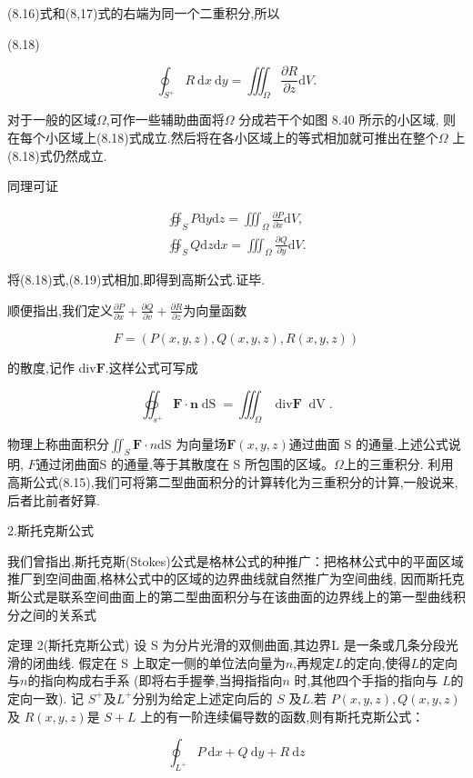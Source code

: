 \documentclass{article}
\begin{document}
(8.16)式和(8,17)式的右端为同一个二重积分,所以

(8.18)

$$\oint_{S^+}R\:\mathrm{d}x\:\mathrm{d}y=\iiint_{\Omega}\frac{\partial R}{\partial z}\mathrm{d}V.$$

对于一般的区域$\Omega$,可作一些辅助曲面将$\Omega$ 分成若干个如图 8.40 所示的小区域,
则在每个小区域上(8.18)式成立.然后将在各小区域上的等式相加就可推出在整个$\Omega$ 上(8.18)式仍然成立.

同理可证

$$\begin{aligned}\oiint_SP\mathrm{d}y\mathrm{d}z=\iiint_\Omega\frac{\partial P}{\partial x}\mathrm{d}V,\\\oiint_SQ\mathrm{d}z\mathrm{d}x=\iiint_\Omega\frac{\partial Q}{\partial y}\mathrm{d}V.\end{aligned}$$

将(8.18)式,(8.19)式相加,即得到高斯公式.证毕.

顺便指出,我们定义$\frac{\partial P}{\partial x}+\frac{\partial Q}{\partial v}+\frac{\partial R}{\partial z}$为向量函数

$$F=(P(x,y,z),Q(x,y,z),R(x,y,z))$$

的散度,记作 div$\boldsymbol{F}.$这样公式可写成

$$\oiint_{s^+}\boldsymbol{F}\cdot\boldsymbol{n}\operatorname{dS}=\iiint_{\Omega}\operatorname{div\boldsymbol{F}}\operatorname{dV}.$$

物理上称曲面积分$\iint_S\boldsymbol{F}\cdot n$dS 为向量场$\boldsymbol{F}(x,y,z)$通过曲面 S 的通量.上述公式说明,
$F$通过闭曲面S 的通量,等于其散度在 S 所包围的区域。$\Omega$上的三重积分.
利用高斯公式(8.15),我们可将第二型曲面积分的计算转化为三重积分的计算,一般说来,后者比前者好算.


\newpage
2.斯托克斯公式

我们曾指出,斯托克斯(Stokes)公式是格林公式的种推广：把格林公式中的平面区域推厂到空间曲面,格林公式中的区域的边界曲线就自然推广为空间曲线,
因而斯托克斯公式是联系空间曲面上的第二型曲面积分与在该曲面的边界线上的第一型曲线积分之间的关系式

定理 2(斯托克斯公式) 设 S 为分片光滑的双侧曲面,其边界L 是一条或几条分段光滑的闭曲线.
假定在 S 上取定一侧的单位法向量为$n$,再规定$L$的定向,使得$L$的定向与$n$的指向构成右手系
(即将右手握拳,当拇指指向$n$ 时,其他四个手指的指向与 $L$的定向一致).
记 $S^+$及$L^+$分别为给定上述定向后的 $S$ 及$L$.若 $P(x,y,z),Q(x,y,z)$及 $R(x,y,z)$是 $S+L$ 上的有一阶连续偏导数的函数,则有斯托克斯公式：

$$\oint_{L^+}P\mathrm{~d}x+Q\mathrm{~d}y+R\mathrm{~d}z$$
\end{document}
